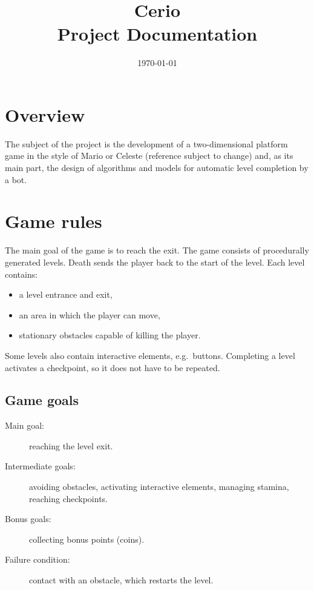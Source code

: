 \documentclass[11pt,a4paper]{article}
\title{Cerio\\[0.3em]\large Project Documentation}
\author{}
\date{\today}
\begin{document}
\maketitle
\tableofcontents
\newpage

\section{Overview}

The subject of the project is the development of a two-dimensional platform game in the style
of Mario or Celeste (reference subject to change) and, as its main part, the design of
algorithms and models for automatic level completion by a bot.

\section{Game rules}

The main goal of the game is to reach the exit. The game consists of procedurally generated
levels. Death sends the player back to the start of the level. Each level contains:
\begin{itemize}
  \item a level entrance and exit,
  \item an area in which the player can move,
  \item stationary obstacles capable of killing the player.
\end{itemize}
Some levels also contain interactive elements, e.g.\ buttons. Completing a level activates
a checkpoint, so it does not have to be repeated.

\subsection{Game goals}

\begin{description}
  \item[Main goal:] reaching the level exit.
  \item[Intermediate goals:] avoiding obstacles, activating interactive elements,
        managing stamina, reaching checkpoints.
  \item[Bonus goals:] collecting bonus points (coins).
  \item[Failure condition:] contact with an obstacle, which restarts the level.
\end{description}
\end{document}
